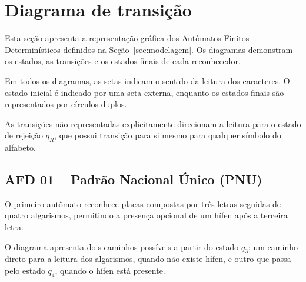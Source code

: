\clearpage
\section{Diagrama de transição}
\label{sec:diagramas}

Esta seção apresenta a representação gráfica dos Autômatos
Finitos Determinísticos definidos na Seção~\ref{sec:modelagem}. Os diagramas
demonstram os estados, as transições e os estados finais de
cada reconhecedor.

Em todos os diagramas, as setas indicam o sentido da leitura
dos caracteres. O estado inicial é indicado por uma seta
externa, enquanto os estados finais são representados por
círculos duplos.

As transições não representadas explicitamente direcionam
a leitura para o estado de rejeição $q_R$, que possui
transição para si mesmo para qualquer símbolo do alfabeto.





\subsection{AFD 01 -- Padrão Nacional Único (PNU)}

O primeiro autômato reconhece placas compostas por três
letras seguidas de quatro algarismos, permitindo a presença
opcional de um hífen após a terceira letra.

O diagrama apresenta dois caminhos possíveis a partir
do estado $q_3$: um caminho direto para a leitura dos
algarismos, quando não existe hífen, e outro que passa
pelo estado $q_4$, quando o hífen está presente.

